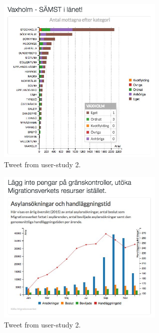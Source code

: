 \documentclass{acmtog} %
\begin{document}
\begin{figure}
\centering
\includegraphics[width=8cm]{img/tweet2_3.png}
\caption{Tweet from user-study 2.}
\label{fig:tweet2_3}
\end{figure}

\begin{figure}
\centering
\includegraphics[width=8cm]{img/tweet2_4.png}
\caption{Tweet from user-study 2.}
\label{fig:tweet2_4}
\end{figure}



\end{document}
